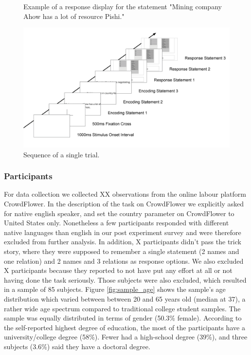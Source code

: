 \documentclass[a4paper,man,natbib,floatsintext,import]{apa6}
\begin{document}
\begin{figure}
\begin{center}
\caption{Example of a response display for the statement "Mining company Ahow has a lot of resource Pishi."}
\label{fig:example_response_menu}
\end{center}
\end{figure}

\begin{figure}
\begin{center}
\includegraphics[width=\textwidth]{figures/trial_sequence.png}
\caption{Sequence of a single trial.}
\label{fig:trial_sequence}
\end{center}
\end{figure}

\subsubsection{Participants}
For data collection we collected XX observations from the online labour platform CrowdFlower. In the description of the task on CrowdFlower we explicitly asked for native english speaker, and set the country parameter on CrowdFlower to United States only. Nonetheless a few participants responded with different native languages than english in our post experiment survey and were therefore excluded from further analysis. In addition, X participants didn't pass the trick story, where they were supposed to remember a single statement (2 names and one relation) and 2 names and 3 relations as response options. We also excluded X participants because they reported to not have put any effort at all or not having done the task seriously. Those subjects were also excluded, which resulted in a sample of 85 subjects. Figure \ref{fig:sample_age} shows the sample's age distribution which varied between between 20 and 65 years old (median at 37), a rather wide age spectrum compared to traditional college student samples. The sample was equally distributed in terms of gender (50.3\% female). According to the self-reported highest degree of education, the most of the participants have a university/college degree (58\%). Fewer had a high-school degree (39\%), and three subjects (3.6\%) said they have a doctoral degree.
\end{document}
